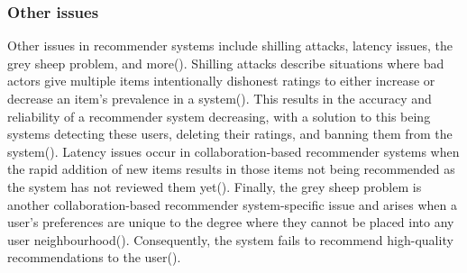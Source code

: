 \documentclass{l4proj}
\begin{document}
\subsubsection{Other issues}
Other issues in recommender systems include shilling attacks, latency issues, the grey sheep problem, and more(\cite{Roy_Dutta_2022}). Shilling attacks describe situations where bad actors give multiple items intentionally dishonest ratings to either increase or decrease an item's prevalence in a system(\cite{Roy_Dutta_2022}). This results in the accuracy and reliability of a recommender system decreasing, with a solution to this being systems detecting these users, deleting their ratings, and banning them from the system(\cite{Roy_Dutta_2022}). Latency issues occur in collaboration-based recommender systems when the rapid addition of new items results in those items not being recommended as the system has not reviewed them yet(\cite{Roy_Dutta_2022}). Finally, the grey sheep problem is another collaboration-based recommender system-specific issue and arises when a user's preferences are unique to the degree where they cannot be placed into any user neighbourhood(\cite{Roy_Dutta_2022}). Consequently, the system fails to recommend high-quality recommendations to the user(\cite{Roy_Dutta_2022}).
\end{document}
